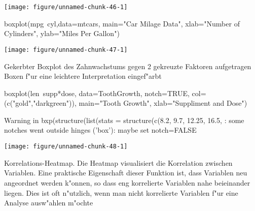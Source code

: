 \documentclass[a4paper,twoside]{tufte-book}\usepackage[]{graphicx}\usepackage[]{color}
\makeatletter
\def\maxwidth{ %
  \ifdim\Gin@nat@width>\linewidth
    \linewidth
  \else
    \Gin@nat@width
  \fi
}
\makeatother
\begin{document}
\begin{appendices}
\begin{Schunk}
{\centering \texttt{[image: figure/unnamed-chunk-46-1]} 

}

\end{Schunk}



\begin{Schunk}
\begin{Sinput}
boxplot(mpg~cyl,data=mtcars, main="Car Milage Data", 
   xlab="Number of Cylinders", ylab="Miles Per Gallon")
\end{Sinput}


{\centering \texttt{[image: figure/unnamed-chunk-47-1]} 

}

\end{Schunk}

Gekerbter Boxplot des Zahnwachstums gegen 2 gekreuzte Faktoren aufgetragen
Boxen f"ur eine leichtere Interpretation eingef"arbt

\begin{Schunk}
\begin{Sinput}
boxplot(len~supp*dose, data=ToothGrowth, notch=TRUE, 
  col=(c("gold","darkgreen")),
  main="Tooth Growth", xlab="Suppliment and Dose")
\end{Sinput}
\begin{Soutput}
Warning in bxp(structure(list(stats = structure(c(8.2, 9.7, 12.25, 16.5, : some notches went outside hinges ('box'): maybe set notch=FALSE
\end{Soutput}


{\centering \texttt{[image: figure/unnamed-chunk-48-1]} 

}

\end{Schunk}



Korrelations-Heatmap. Die Heatmap visualisiert die Korrelation zwischen Variablen. Eine praktische Eigenschaft dieser Funktion ist, dass Variablen neu angeordnet werden k"onnen, so dass eng korrelierte Variablen nahe beieinander liegen. Dies ist oft n"utzlich, wenn man nicht korrelierte Variablen f"ur eine Analyse ausw"ahlen m"ochte


\end{appendices}
\end{document}
